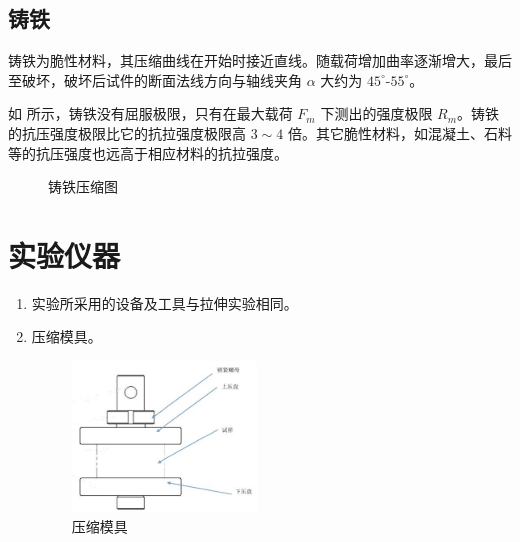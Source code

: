 \documentclass[a4paper,utf8]{article}
\begin{document}
        \subsection{铸铁}
            铸铁为脆性材料，其压缩曲线在开始时接近直线。随载荷增加曲率逐渐增大，最后至破坏，破坏后试件的断面法线方向与轴线夹角 $\alpha$ 大约为 $45^\circ$-$55^\circ$。\par
            如 所示，铸铁没有屈服极限，只有在最大载荷 $F_m$ 下测出的强度极限 $R_m$。铸铁的抗压强度极限比它的抗拉强度极限高 $3\sim4$ 倍。其它脆性材料，如混凝土、石料等的抗压强度也远高于相应材料的抗拉强度。
            \begin{figure}[!ht]
                \hspace{10mm}
                \caption{铸铁压缩图}\label{fig:5a}
            \end{figure}
\section{实验仪器}%
    \begin{enumerate}
        \item 实验所采用的设备及工具与拉伸实验相同。
        \item 压缩模具。
        \begin{figure}[!ht]
            \caption{压缩模具}
            \includegraphics[height=40mm]{3.jpg}
        \end{figure}
    \end{enumerate}
\end{document}
